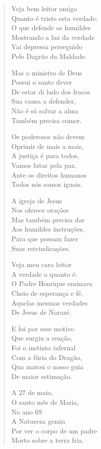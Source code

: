 \begin{verse}
Veja bem leitor amigo\\
Quanto é triste esta verdade:\\
O que defende os humildes\\
Mostrando a luz da verdade\\
Vai depressa perseguido\\
Pelo Dagrão da Maldade.

Mas o ministro de Deus\\
Possui o santo dever\\
De estar di lado dos fracos\\
Sua causa a defender,\\
Não é só salvar a alma\\
Também precisa comer.

Os poderosos não devem\\
Oprimir de mais a mais,\\
A justiça é para todos,\\
Vamos lutar pela paz.\\
Ante os direitos humanos\\
Todos nós somos iguais.

A igreja de Jesus\\
Nos oferece orações\\
Mas também precisa dar\\
Aos humildes instruções,\\
Para que possam fazer\\
Suas reivindicações.

Veja meu caro leitor\\
A verdade o quanto é:\\
O Padre Henrique ensinava\\
Cheio de esperança e fé,\\
Aquelas mesmas verdades\\
De Jesus de Narazé.

E foi por esse motivo\\
Que surgiu a reação,\\
Foi o instinto infernal\\
Com a fúria do Dragão,\\
Qua matou o nosso guia\\
De maior estimação.

A 27 de maio,\\
O santo mês de Maria,\\
No ano 69\\
A Natureza gemia\\
Por ver o corpo de um padre\\
Morto sobre a terra fria.


\end{verse}
